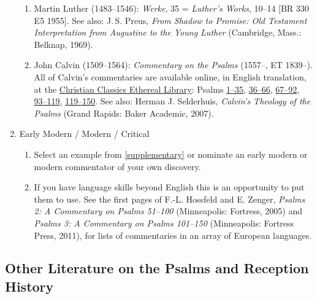 \documentclass[titlepage]{article}
\begin{document}
\begin{enumerate}
\begin{enumerate}
	\item Martin Luther (1483--1546): \emph{Werke}, 35 = \emph{Luther’s Works}, 10--14 [BR 330 E5 1955]. See also: J.\,S. Preus, \emph{From Shadow to Promise: Old Testament Interpretation from Augustine to the Young Luther} (Cambridge, Mass.: Belknap, 1969).

	\item John Calvin (1509--1564): \emph{Commentary on the Psalms} (1557--, ET 1839--). All of Calvin's commentaries are available online, in English translation, at the \href{http://www.ccel.org/}{Christian Classics Ethereal Library}: Psalms \href{http://www.ccel.org/ccel/calvin/calcom08.html}{1--35}, \href{http://www.ccel.org/ccel/calvin/calcom09.html}{36--66}, \href{http://www.ccel.org/ccel/calvin/calcom10.html}{67--92}, \href{http://www.ccel.org/ccel/calvin/calcom11.html}{93--119}, \href{http://www.ccel.org/ccel/calvin/calcom12.html}{119--150}. See also: Herman J. Selderhuis, \emph{Calvin's Theology of the Psalms} (Grand Rapids: Baker Academic, 2007).

  \end{enumerate}
 \item Early Modern / Modern / Critical
  \begin{enumerate}

	\item Select an example from \autoref{supplementary} or nominate an early modern or modern commentator of your own discovery.

	\item If you have language skills beyond English this is an opportunity to put them to use. See the first pages of F.-L. Hossfeld and E. Zenger, \emph{Psalms 2: A Commentary on Psalms 51--100} (Minneapolis: Fortress, 2005) and \emph{Psalms 3: A Commentary on Psalms 101--150} (Minneapolis: Fortress Press, 2011), for lists of commentaries in an array of European languages.

  \end{enumerate}

\end{enumerate}

\subsection{Other Literature on the Psalms and Reception History}
\label{horbib}
\end{document}
